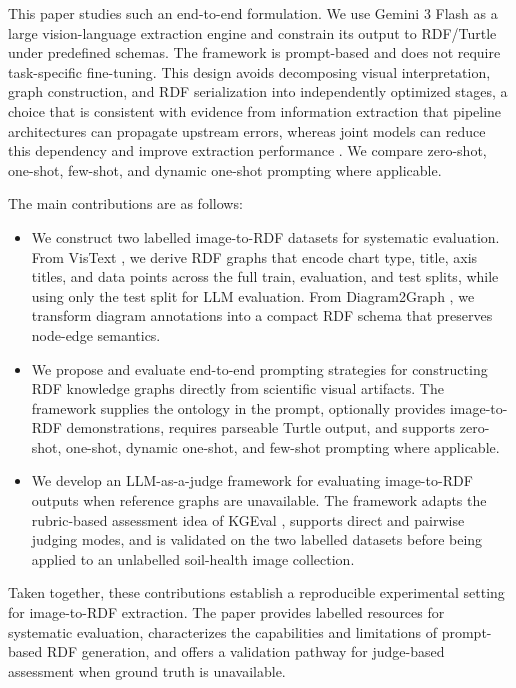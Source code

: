 \documentclass[preprint,12pt]{elsarticle}
\begin{document}
This paper studies such an end-to-end formulation. We use Gemini 3 Flash \citep{googledeepmind2025gemini3flashcard} as a large vision-language extraction engine and constrain its output to RDF/Turtle under predefined schemas. The framework is prompt-based and does not require task-specific fine-tuning. This design avoids decomposing visual interpretation, graph construction, and RDF serialization into independently optimized stages, a choice that is consistent with evidence from information extraction that pipeline architectures can propagate upstream errors, whereas joint models can reduce this dependency and improve extraction performance \citep{li2017neuraljoint}. We compare zero-shot, one-shot, few-shot, and dynamic one-shot prompting where applicable.

The main contributions are as follows:
\begin{itemize}
    \item We construct two labelled image-to-RDF datasets for systematic evaluation. From VisText \citep{vistext}, we derive RDF graphs that encode chart type, title, axis titles, and data points across the full train, evaluation, and test splits, while using only the test split for LLM evaluation. From Diagram2Graph \citep{diagram2graph}, we transform diagram annotations into a compact RDF schema that preserves node-edge semantics.
    \item We propose and evaluate end-to-end prompting strategies for constructing RDF knowledge graphs directly from scientific visual artifacts. The framework supplies the ontology in the prompt, optionally provides image-to-RDF demonstrations, requires parseable Turtle output, and supports zero-shot, one-shot, dynamic one-shot, and few-shot prompting where applicable.
    \item We develop an LLM-as-a-judge framework for evaluating image-to-RDF outputs when reference graphs are unavailable. The framework adapts the rubric-based assessment idea of KGEval \citep{kgeval}, supports direct and pairwise judging modes, and is validated on the two labelled datasets before being applied to an unlabelled soil-health image collection.
\end{itemize}

Taken together, these contributions establish a reproducible experimental setting for image-to-RDF extraction. The paper provides labelled resources for systematic evaluation, characterizes the capabilities and limitations of prompt-based RDF generation, and offers a validation pathway for judge-based assessment when ground truth is unavailable.
\end{document}
